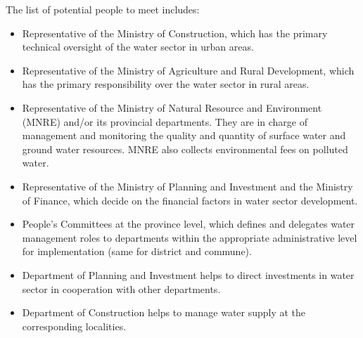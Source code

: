 \documentclass[11pt,english]{article}
\theoremstyle{plain} \newtheorem{claim}{Claim}
\theoremstyle{plain} \newtheorem{prop}{Proposition}
\theoremstyle{plain} \newtheorem{hypo}{Hypothesis}
\begin{document}
The list of potential people to meet includes: 
\begin{itemize}
\item	Representative of the Ministry of Construction, which has the primary technical oversight of the water sector in urban areas. 
\item	Representative of the Ministry of Agriculture and Rural Development, which has the primary responsibility over the water sector in rural areas. 
\item	Representative of the Ministry of Natural Resource and Environment (MNRE) and/or its provincial departments. They are in charge of management and monitoring the quality and quantity of surface water and ground water resources. MNRE also collects environmental fees on polluted water. 
\item	Representative of the Ministry of Planning and Investment and the Ministry of Finance, which decide on the financial factors in water sector development. 
\item	People's Committees at the province level, which defines and delegates water management roles to departments within the appropriate administrative level for implementation (same for district and commune). 
\item	Department of Planning and Investment helps to direct investments in water sector in cooperation with other departments.
\item	Department of Construction helps to manage water supply at the corresponding localities. 
\end{itemize}


\clearpage



\end{document}
